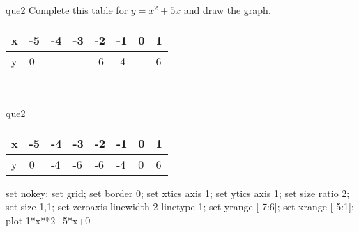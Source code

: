 \documentclass[13.5pt, varwidth=true]{beamer}
\begin{document}
\begin{frame}[shrink=19,fragile]
	\begin{beamercolorbox}[rounded=true, left, shadow=true,wd=14.8cm]{que2}
		 Complete this table for $y = x^{2} + 5x$ and draw the graph. \\[0.3cm] \renewcommand{\arraystretch}{1.2}\begin{tabular}{|C|C|C|C|C|C|C|C|} \hline x & -5 & -4 & -3 & -2 & -1 & 0 & 1 \\ \hline y & 0 &  &  & -6 & -4 &  & 6\\ \hline \end{tabular}\\[0.3cm]
	\end{beamercolorbox}
\end{frame}
\begin{frame}[shrink=19,fragile]
	\begin{beamercolorbox}[rounded=true, left, shadow=true,wd=14.8cm]{que2}
		\renewcommand{\arraystretch}{1.2}\begin{tabular}{|C|C|C|C|C|C|C|C|} \hline x & -5 & -4 & -3 & -2 & -1 & 0 & 1 \\ \hline y & 0 & -4 & -6 & -6 & -4 & 0 & 6\\ \hline \end{tabular}\begin{gnuplot}[terminal=pdf] set nokey; set grid; set border 0; set xtics axis 1; set ytics axis 1; set size ratio 2; set size 1,1; set zeroaxis linewidth 2 linetype 1; set yrange [-7:6]; set xrange [-5:1]; plot 1*x**2+5*x+0 \end{gnuplot}
	\end{beamercolorbox}
\end{frame}
\end{document}
